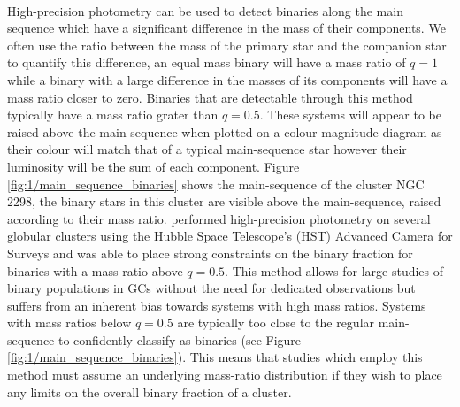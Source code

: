 \paragraph{}
High-precision photometry can be used to detect binaries along the main sequence which have a
significant difference in the mass of their components. We often use the ratio between the mass of
the primary star and the companion star to quantify this difference, an equal mass binary will have
a mass ratio of $q=1$ while a binary with a large difference in the masses of its components will
have a mass ratio closer to zero. Binaries that are detectable through this method typically have a
mass ratio grater than $q=0.5$. These systems will appear to be raised above the main-sequence when
plotted on a colour-magnitude diagram as their colour will match that of a typical main-sequence
star however their luminosity will be the sum of each component. Figure
\ref{fig:1/main_sequence_binaries} shows the main-sequence of the cluster NGC\,2298, the binary
stars in this cluster are visible above the main-sequence, raised according to their mass ratio.
\citet{Milone2012} performed high-precision photometry on several globular clusters using the Hubble
Space Telescope's (HST) Advanced Camera for Surveys and was able to place strong constraints on the
binary fraction for binaries with a mass ratio above $q=0.5$. This method allows for large studies
of binary populations in GCs without the need for dedicated observations but suffers from an
inherent bias towards systems with high mass ratios. Systems with mass ratios below $q=0.5$ are
typically too close to the regular main-sequence to confidently classify as binaries (see Figure
\ref{fig:1/main_sequence_binaries}). This means that studies which employ this method must assume an
underlying mass-ratio distribution if they wish to place any limits on the overall binary fraction
of a cluster.


